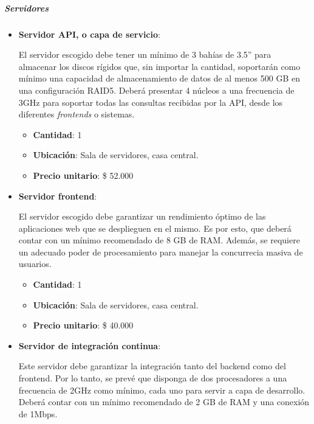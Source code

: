 \subparagraph{Servidores}

	\begin{itemize}
		\item \textbf{Servidor API, o capa de servicio}:
        
        El servidor escogido debe tener un mínimo de 3 bahías de 3.5” para almacenar los discos rígidos que, sin importar la cantidad, soportarán como mínimo una capacidad de almacenamiento de datos de al menos 500 GB en una configuración RAID5.
        Deberá presentar 4 núcleos a una frecuencia de 3GHz para soportar todas las consultas recibidas por la API, desde los diferentes \textit{frontends} o sistemas.
        
        \begin{itemize}
            \item \textbf{Cantidad}: 1
            \item \textbf{Ubicación}: Sala de servidores, casa central.
            \item \textbf{Precio unitario}: \$ 52.000
        \end{itemize}

		\item \textbf{Servidor frontend}:
        
        El servidor escogido debe garantizar un rendimiento óptimo de las aplicaciones web que se desplieguen en el mismo. Es por esto, que deberá contar con un mínimo recomendado de 8 GB de RAM. 
        Además, se requiere un adecuado poder de procesamiento para manejar la concurrecia masiva de usuarios.
        
        \begin{itemize}
            \item \textbf{Cantidad}: 1
            \item \textbf{Ubicación}: Sala de servidores, casa central.
            \item \textbf{Precio unitario}: \$ 40.000
        \end{itemize}
        
		\item \textbf{Servidor de integración continua}:
        
        Este servidor debe garantizar la integración tanto del backend como del frontend.
        Por lo tanto, se prevé que disponga de dos procesadores a una frecuencia de 2GHz como mínimo, cada uno para servir a capa de desarrollo. Deberá contar con un mínimo recomendado de 2 GB de RAM y una conexión de 1Mbps.
        

\end{itemize}
